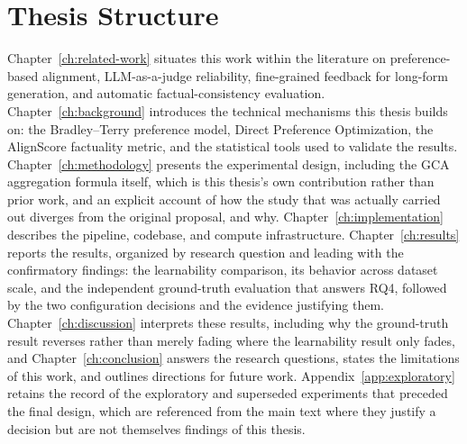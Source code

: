 \section{Thesis Structure}
\label{sec:intro-structure}

Chapter~\ref{ch:related-work} situates this work within the literature on
preference-based alignment, LLM-as-a-judge reliability, fine-grained feedback for
long-form generation, and automatic factual-consistency evaluation.
Chapter~\ref{ch:background} introduces the technical mechanisms this thesis builds
on: the Bradley--Terry preference model, Direct Preference Optimization, the
AlignScore factuality metric, and the statistical tools
used to validate the results. Chapter~\ref{ch:methodology} presents the experimental
design, including the GCA aggregation formula itself, which is this thesis's own
contribution rather than prior work, and an explicit account of how the study that
was actually carried out diverges from the original proposal, and why. Chapter~\ref{ch:implementation}
describes the pipeline, codebase, and compute infrastructure.
Chapter~\ref{ch:results} reports the results, organized by research
question and leading with the confirmatory findings: the learnability
comparison, its behavior across dataset scale, and the independent
ground-truth evaluation that answers RQ4, followed by the two configuration
decisions and the evidence justifying them.
Chapter~\ref{ch:discussion} interprets these results, including why the
ground-truth result reverses rather than merely fading where the learnability
result only fades, and Chapter~\ref{ch:conclusion} answers the research
questions, states the limitations of this work, and outlines directions for
future work. Appendix~\ref{app:exploratory} retains the record of the
exploratory and superseded experiments that preceded the final design, which
are referenced from the main text where they justify a decision but are not
themselves findings of this thesis.
